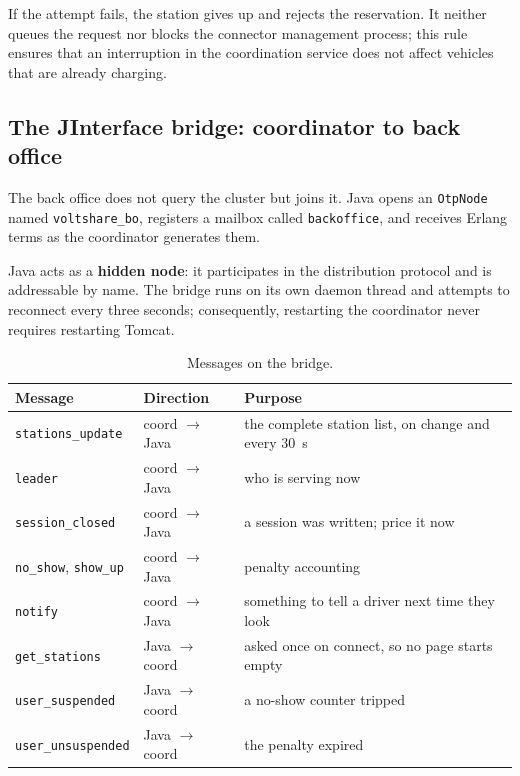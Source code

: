 If the attempt fails, the station gives up and rejects the reservation. It neither queues the request nor blocks the connector management process; this rule ensures that an interruption in the coordination service does not affect vehicles that are already charging.

\subsection{The JInterface bridge: coordinator to back office}
\label{sec:api-bridge}

The back office does not query the cluster but joins it. Java opens an \texttt{OtpNode} named
\texttt{voltshare\_bo}, registers a mailbox called \texttt{backoffice}, and receives Erlang terms
as the coordinator generates them.

Java acts as a \textbf{hidden node}: it participates in the distribution protocol and is addressable
by name.
The bridge runs on its own daemon thread and attempts to reconnect every three seconds;
consequently, restarting the coordinator never requires restarting Tomcat.


\begin{table}[h]
\centering\small
\renewcommand{\arraystretch}{1.15}
\caption{Messages on the bridge.}
\label{tab:bridge}
\begin{tabularx}{\textwidth}{@{}>{\raggedright\arraybackslash}p{3.3cm} l X@{}}
\toprule
Message & Direction & Purpose \\
\midrule
\texttt{stations\_update} & coord $\to$ Java & the complete station list, on change and
  every 30~s \\
\texttt{leader} & coord $\to$ Java & who is serving now \\
\texttt{session\_closed} & coord $\to$ Java & a session was written; price it now \\
\texttt{no\_show}, \texttt{show\_up} & coord $\to$ Java & penalty accounting \\
\texttt{notify} & coord $\to$ Java & something to tell a driver next time they look \\
\texttt{get\_stations} & Java $\to$ coord & asked once on connect, so no page starts empty \\
\texttt{user\_suspended} & Java $\to$ coord & a no-show counter tripped \\
\texttt{user\_unsuspended} & Java $\to$ coord & the penalty expired \\
\bottomrule
\end{tabularx}
\end{table}

